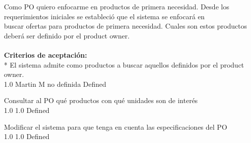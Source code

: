 \vspace{20pt}

	{Como PO quiero enfocarme en productos de primera necesidad.} %
	{Desde los requerimientos iniciales se estableció que el sistema se enfocará en\\
buscar ofertas para productos de primera necesidad. Cuales son estos productos\\
deberá ser definido por el product owner.\\
  \\
\textbf{Criterios de aceptación:}\\
* El sistema admite como productos a buscar aquellos definidos por el product owner.\\
} %
	{} %
	{1.0} %
	{Martin M} %
	{no definida} %
	{Defined} %

		{Consultar al PO qué productos con qué unidades son de interés} %
		{\\
} %
		{1.0} %
		{} %
		{1.0} %
		{Defined} %

		{Modificar el sistema para que tenga en cuenta las especificaciones del PO} %
		{\\
} %
		{1.0} %
		{} %
		{1.0} %
		{Defined} %


\vspace{20pt}

